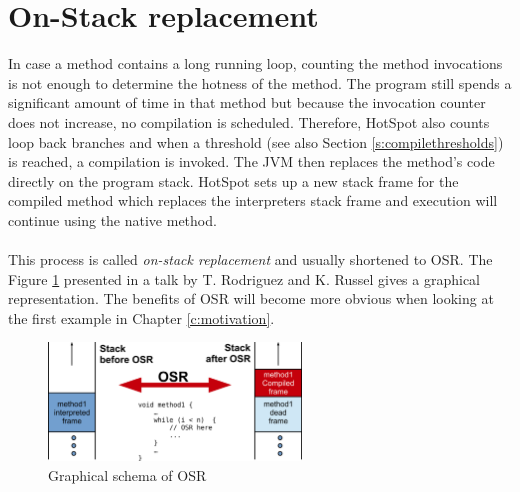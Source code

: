 \section{On-Stack replacement}
\label{s:onstackreplacement}
In case a method contains a long running loop, counting the method invocations is not enough to determine the hotness of the method. The program still spends a significant amount of time in that method but because the invocation counter does not increase, no compilation is scheduled.
Therefore, HotSpot also counts loop back branches and when a threshold (see also Section \ref{s:compilethresholds}) is reached, a compilation is invoked. The JVM then replaces the method's code directly on the program stack. HotSpot sets up a new stack frame for the compiled method which replaces the interpreters stack frame and execution will continue using the native method.
\\\\
This process is called \textit{on-stack replacement} and usually shortened to OSR. The Figure \ref{f:osr} presented in a talk by T. Rodriguez and K. Russel \cite{client_compiler_talk} gives a graphical representation.
The benefits of OSR will become more obvious when looking at the first example in Chapter \ref{c:motivation}.
\begin{figure}[ht]
  \begin{center}
    \centering
    \includegraphics[width=0.6\textwidth]{figures/osr.png}
    \caption{Graphical schema of OSR}
    \label{f:osr}
  \end{center}
\end{figure}

